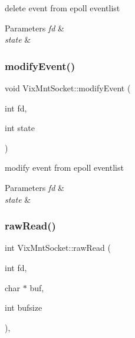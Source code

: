 delete event from epoll eventlist 


\begin{DoxyParams}{Parameters}
{\em fd} & \\
\hline
{\em state} & \\
\hline
\end{DoxyParams}
\hypertarget{class_vix_mnt_socket_a1c480a5b37f5938480781d40f00ce386}{}\label{class_vix_mnt_socket_a1c480a5b37f5938480781d40f00ce386} 
\subsubsection{\texorpdfstring{modify\+Event()}{modifyEvent()}}
{\ttfamily void Vix\+Mnt\+Socket\+::modify\+Event (\begin{DoxyParamCaption}\item[{int}]{fd,  }\item[{int}]{state }\end{DoxyParamCaption})\hspace{0.3cm}{\ttfamily [protected]}}



modify event from epoll eventlist 


\begin{DoxyParams}{Parameters}
{\em fd} & \\
\hline
{\em state} & \\
\hline
\end{DoxyParams}
\hypertarget{class_vix_mnt_socket_aad48ed0239fc3fb9e822cc13e6fefa97}{}\label{class_vix_mnt_socket_aad48ed0239fc3fb9e822cc13e6fefa97} 
\subsubsection{\texorpdfstring{raw\+Read()}{rawRead()}}
{\ttfamily int Vix\+Mnt\+Socket\+::raw\+Read (\begin{DoxyParamCaption}\item[{int}]{fd,  }\item[{char $\ast$}]{buf,  }\item[{int}]{bufsize }\end{DoxyParamCaption})\hspace{0.3cm}{\ttfamily [protected]}, {\ttfamily [virtual]}}



